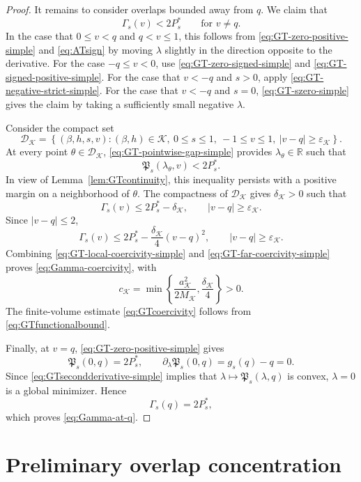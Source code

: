 \documentclass[11pt]{article}
\numberwithin{equation}{section}
\newcommand{\1}{\mathbf 1}
\newcommand{\cK}{\mathcal K}
\begin{document}
\begin{proof}
It remains to consider overlaps bounded away from $q$.  We claim that
\begin{equation}
 \Gamma_s(v)<2P_s^*
 \qquad\text{for }v\ne q.
 \label{eq:GT-pointwise-gap-simple}
\end{equation}
In the case that $0\le v<q$ and $q<v\le1$, this follows from \eqref{eq:GT-zero-positive-simple} and \eqref{eq:ATsign} by moving
$\lambda$ slightly in the direction opposite to the derivative.
For the case $-q\le v<0$, use \eqref{eq:GT-zero-signed-simple} and \eqref{eq:GT-signed-positive-simple}.
For the case that $v<-q$ and $s>0$, apply \eqref{eq:GT-negative-strict-simple}.
For the case that $v<-q$ and $s=0$, \eqref{eq:GT-szero-simple} gives the claim by taking a sufficiently small negative $\lambda$.

Consider the compact set
\[
 \mathcal D_{\cK}
 =
 \left\{
 (\beta,h,s,v):
 (\beta,h)\in\cK,\ 0\le s\le1,\ -1\le v\le1,\
 |v-q|\ge\varepsilon_{\cK}
 \right\}.
\]
At every point $\theta\in\mathcal D_{\cK}$,
\eqref{eq:GT-pointwise-gap-simple} provides
$\lambda_\theta\in\mathbb R$ such that
\[
 \mathfrak P_s(\lambda_\theta,v)<2P_s^*.
\]
In view of Lemma~\ref{lem:GTcontinuity}, this inequality persists with a
positive margin on a neighborhood of $\theta$.
The compactness of ${\mathcal D}_\cK$ gives $\delta _{\cK}>0$ such that
\[
 \Gamma_s(v)\le2P_s^*-\delta _{\cK},
 \qquad |v-q|\ge\varepsilon_{\cK}.
\]
Since $|v-q|\le2$,
\begin{equation}
 \Gamma_s(v)
 \le
 2P_s^*-\frac{\delta _{\cK}}4(v-q)^2,
 \qquad |v-q|\ge\varepsilon_{\cK}.
 \label{eq:GT-far-coercivity-simple}
\end{equation}
Combining \eqref{eq:GT-local-coercivity-simple} and
\eqref{eq:GT-far-coercivity-simple} proves
\eqref{eq:Gamma-coercivity}, with
\[
 c_{\cK}
 =
 \min\left\{
 \frac{a_{\cK}^2}{2M_{\cK}},
 \frac{\delta _{\cK}}4
 \right\}>0.
\]
The finite-volume estimate \eqref{eq:GTcoercivity} follows from
\eqref{eq:GTfunctionalbound}.

Finally, at $v=q$, \eqref{eq:GT-zero-positive-simple} gives
\[
 \mathfrak P_s(0,q)=2P_s^*,
 \qquad
 \partial_\lambda\mathfrak P_s(0,q)=g_s(q)-q=0.
\]
Since \eqref{eq:GTsecondderivative-simple} implies that $\lambda\mapsto\mathfrak P_s(\lambda,q)$ is convex, $\lambda=0$ is
a global minimizer.  Hence
\[
 \Gamma_s(q)=2P_s^*,
\]
which proves \eqref{eq:Gamma-at-q}.
\end{proof}


\section{Preliminary overlap concentration}\label{sec:concentration}
\end{document}
